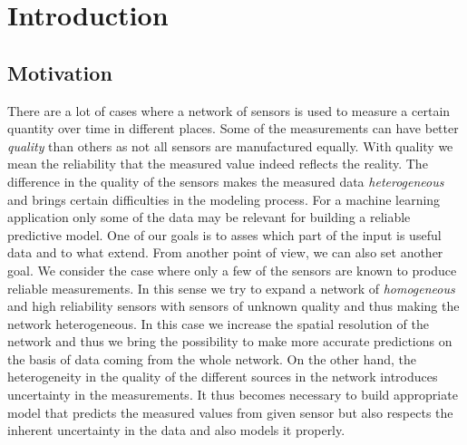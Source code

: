 \documentclass[12pt,a4paper,twoside]{scrartcl}
\numberwithin{equation}{section}
\begin{document}
\vfill\vfill\vfill
\clearpage

\pagestyle{plain}

\renewcommand\sectionmark[1]{\markboth{\thesection\quad\MakeUppercase{#1}}{\thesection\quad\MakeUppercase{#1}}}
\renewcommand\subsectionmark[1]{\markright{\thesubsection\quad\MakeUppercase{#1}}}

\tableofcontents
\clearpage
\listoffigures
\clearpage

\pagestyle{normal}
\section{Introduction}\label{sec:intoduction}
\subsection{Motivation}\label{sec:motivation}
There are a lot of cases where a network of sensors is used to measure a certain quantity over time in different places. Some of the measurements can have better \emph{quality} than others as not all sensors are manufactured equally. With quality we mean the reliability that the measured value indeed reflects the reality. The difference in the quality of the sensors makes the measured data \emph{heterogeneous} and brings certain difficulties in the modeling process. For a machine learning application only some of the data may be relevant for building a reliable predictive model. One of our goals is to asses which part of the input is useful data and to what extend. From another point of view, we can also set another goal. We consider the case where only a few of the sensors are known to produce reliable measurements. In this sense we try to expand a network of \emph{homogeneous} and high reliability sensors with sensors of unknown quality and thus making the network heterogeneous. In this case we increase the spatial resolution of the network and thus we bring the possibility to make more accurate predictions on the basis of data coming from the whole network. On the other hand, the heterogeneity in the quality of the different sources in the network introduces uncertainty in the measurements. It thus becomes necessary to build appropriate model that predicts the measured values from given sensor but also respects the inherent uncertainty in the data and also models it properly.
\end{document}
